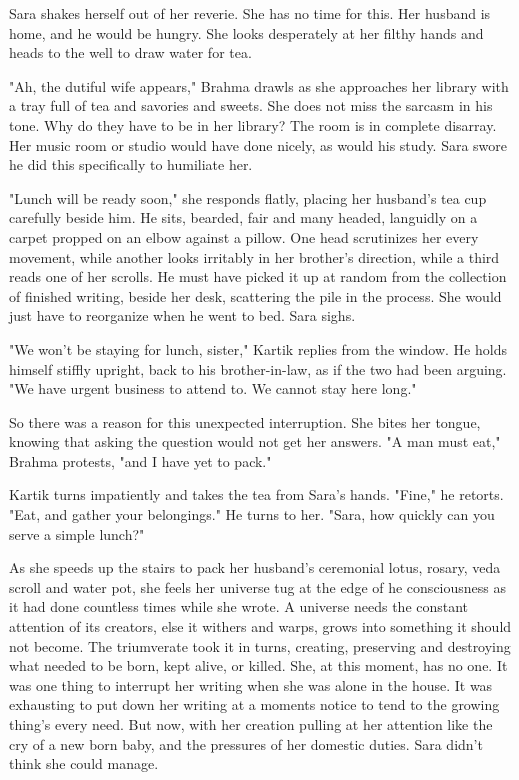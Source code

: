 \documentclass{article}
\begin{document}
Sara shakes herself out of her reverie. She has no time for this. Her husband is home, and he would be hungry. She looks desperately at her filthy hands and heads to the well to draw water for tea.


"Ah, the dutiful wife appears," Brahma drawls as she approaches her library with a tray full of tea and savories and sweets. She does not miss the sarcasm in his tone. Why do they have to be in her library? The room is in complete disarray. Her music room or studio would have done nicely, as would his study. Sara swore he did this specifically to humiliate her.

"Lunch will be ready soon," she responds flatly, placing her husband's tea cup carefully beside him. He sits, bearded, fair and many headed, languidly on a carpet propped on an elbow against a pillow. One head scrutinizes her every movement, while another looks irritably in her brother's direction, while a third reads one of her scrolls. He must have picked it up at random from the collection of finished writing, beside her desk, scattering the pile in the process. She would just have to reorganize when he went to bed. Sara sighs. 

"We won't be staying for lunch, sister," Kartik replies from the window. He holds himself stiffly upright, back to his brother-in-law, as if the two had been arguing. "We have urgent business to attend to. We cannot stay here long." 

So there was a reason for this unexpected interruption. She bites her tongue, knowing that asking the question would not get her answers. "A man must eat," Brahma protests, "and I have yet to pack." 

Kartik turns impatiently and takes the tea from Sara's hands. "Fine," he retorts. "Eat, and gather your belongings." He turns to her. "Sara, how quickly can you serve a simple lunch?" 

As she speeds up the stairs to pack her husband's ceremonial lotus, rosary, veda scroll and water pot, she feels her universe tug at the edge of he consciousness as it had done countless times while she wrote. A universe needs the constant attention of its creators, else it withers and warps, grows into something it should not become. The triumverate took it in turns, creating, preserving and destroying what needed to be born, kept alive, or killed. She, at this moment, has no one. It was one thing to interrupt her writing when she was alone in the house. It was exhausting to put down her writing at a moments notice to tend to the growing thing's every need. But now, with her creation pulling at her attention like the cry of a new born baby, and the pressures of her domestic duties. Sara didn't think she could manage. 
\end{document}
